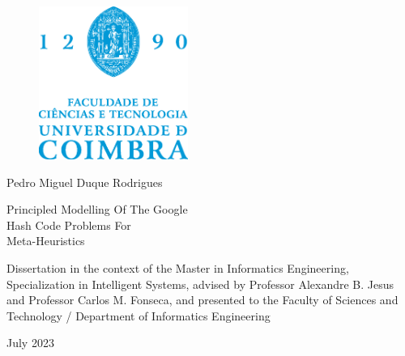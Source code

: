 \thispagestyle{empty}


\vspace*{\fill}

\centering

\begin{figure}[h!]
    \centering
    \includegraphics[height=5cm, keepaspectratio]{../assets/cover/fctuc-logo.eps}
\end{figure}

\vspace{\fill}

\Large{Pedro Miguel Duque Rodrigues}

\vspace{\fill}

\Huge{Principled Modelling Of The Google \\ Hash Code Problems For \\ Meta-Heuristics}

\vspace{\fill}

\normalsize{
    Dissertation in the context of the Master in Informatics Engineering, \\
    Specialization in Intelligent Systems, advised by Professor Alexandre B. Jesus \\
    and Professor Carlos M. Fonseca, and presented to the Faculty
    of Sciences and \\ Technology / Department of Informatics Engineering
}

\vspace{\fill}

\normalsize{July 2023}

\vspace*{\fill}

\restoregeometry
